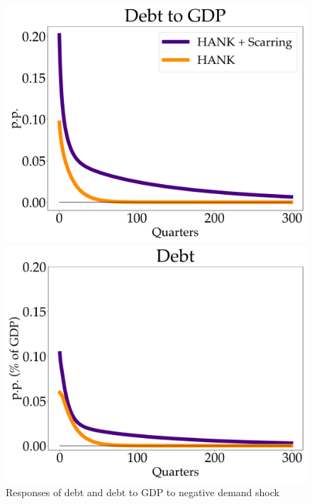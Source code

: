 \begin{figure}[!h]
    \centering
   \begin{minipage}{0.47\textwidth}
        \centering
        \includegraphics[scale=.2]{text/chapter1/Figures/debt_to_GDP_IPR} %
    \end{minipage}\hfill
    \begin{minipage}{0.47\textwidth}
        \centering
        \includegraphics[scale=.2]{text/chapter1/Figures/debt_IPR} %
    \end{minipage}
    \caption{Responses of debt and debt to GDP to negative demand shock}
    \label{debt_to_GDP}
\end{figure}


